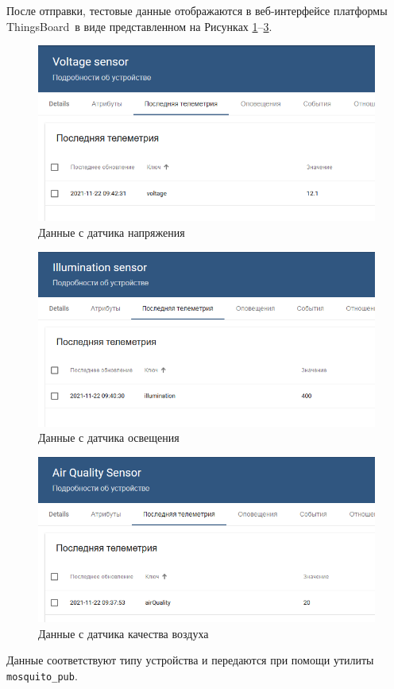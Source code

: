 \documentclass[a4paper,14pt]{extarticle}
\newcommand{\tb}{ThingsBoard~}
\begin{document}
После отправки, тестовые данные отображаются в веб-интерфейсе платформы \tb в виде представленном на Рисунках \mbox{\ref{fig:voltagedata}--\ref{fig:airqualitydata}}. 
\begin{figure}[h!]
	\centering
	\includegraphics[width=0.7\linewidth]{images/VoltageData}
	\caption{Данные с датчика напряжения}
	\label{fig:voltagedata}
\end{figure}
\begin{figure}[h!]
	\centering
	\includegraphics[width=0.7\linewidth]{images/IlluminationData}
	\caption{Данные с датчика освещения}
	\label{fig:illuminationdata}
\end{figure}
\begin{figure}[h!]
	\centering
	\includegraphics[width=0.7\linewidth]{images/airQualityData}
	\caption{Данные с датчика качества воздуха}
	\label{fig:airqualitydata}
\end{figure}


Данные соответствуют типу устройства и передаются при помощи утилиты \texttt{mosquito\_pub}.
\end{document}
